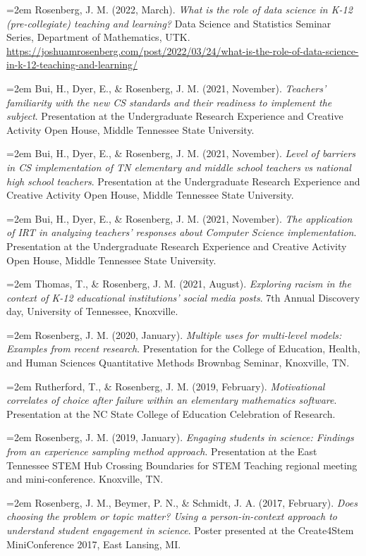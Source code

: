 \documentclass[
  14,
]{article}
\begin{document}
\hangindent=2em Rosenberg, J. M. (2022, March). \emph{What is the role
of data science in K-12 (pre-collegiate) teaching and learning?} Data
Science and Statistics Seminar Series, Department of Mathematics, UTK.
\url{https://joshuamrosenberg.com/post/2022/03/24/what-is-the-role-of-data-science-in-k-12-teaching-and-learning/}

\hangindent=2em Bui, H., Dyer, E., \& Rosenberg, J. M. (2021, November).
\emph{Teachers' familiarity with the new CS standards and their
readiness to implement the subject}. Presentation at the Undergraduate
Research Experience and Creative Activity Open House, Middle Tennessee
State University.

\hangindent=2em Bui, H., Dyer, E., \& Rosenberg, J. M. (2021, November).
\emph{Level of barriers in CS implementation of TN elementary and middle
school teachers vs national high school teachers}. Presentation at the
Undergraduate Research Experience and Creative Activity Open House,
Middle Tennessee State University.

\hangindent=2em Bui, H., Dyer, E., \& Rosenberg, J. M. (2021, November).
\emph{The application of IRT in analyzing teachers' responses about
Computer Science implementation}. Presentation at the Undergraduate
Research Experience and Creative Activity Open House, Middle Tennessee
State University.

\hangindent=2em Thomas, T., \& Rosenberg, J. M. (2021, August).
\emph{Exploring racism in the context of K-12 educational institutions'
social media posts}. 7th Annual Discovery day, University of Tennessee,
Knoxville.

\hangindent=2em Rosenberg, J. M. (2020, January). \emph{Multiple uses
for multi-level models: Examples from recent research}. Presentation for
the College of Education, Health, and Human Sciences Quantitative
Methods Brownbag Seminar, Knoxville, TN.

\hangindent=2em Rutherford, T., \& Rosenberg, J. M. (2019, February).
\emph{Motivational correlates of choice after failure within an
elementary mathematics software}. Presentation at the NC State College
of Education Celebration of Research.

\hangindent=2em Rosenberg, J. M. (2019, January). \emph{Engaging
students in science: Findings from an experience sampling method
approach}. Presentation at the East Tennessee STEM Hub Crossing
Boundaries for STEM Teaching regional meeting and mini-conference.
Knoxville, TN.

\hangindent=2em Rosenberg, J. M., Beymer, P. N., \& Schmidt, J. A.
(2017, February). \emph{Does choosing the problem or topic matter? Using
a person-in-context approach to understand student engagement in
science}. Poster presented at the Create4Stem MiniConference 2017, East
Lansing, MI.
\end{document}
